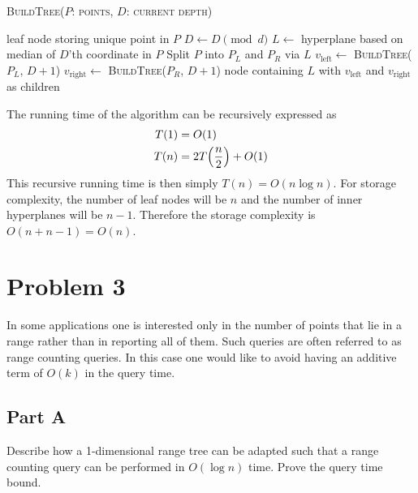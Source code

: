 \documentclass[12pt]{extarticle}
\begin{document}
\begin{solution}
    \begin{algorithm}[H]
        \caption{\textsc{BuildTree($P$: points, $D$: current depth)}}
        \begin{algorithmic}
                \State \Return leaf node storing unique point in $P$
            \Else
                \State $D \gets D \pmod{d}$
                \State $L \gets$ hyperplane based on median of $D$'th coordinate in $P$ 
                \State Split $P$ into $P_L$ and $P_R$ via $L$
                \State $v_{\text{left}} \gets $ \textsc{BuildTree}($P_L$, $D+1$)
                \State $v_{\text{right}} \gets $ \textsc{BuildTree}($P_R$, $D+1$)
                \State \Return node containing $L$ with $v_{\text{left}}$ and $v_{\text{right}}$ as children
            \EndIf
        \end{algorithmic}
    \end{algorithm}

    The running time of the algorithm can be recursively expressed as
    \begin{align*}
        T(1) &= O(1) \\
        T(n) &= 2 T\qty(\frac{n}{2}) + O(1)
    \end{align*}
    This recursive running time is then simply $T(n) = O(n \log n)$. For storage complexity, the number of leaf nodes will be $n$ and the number of inner hyperplanes will be $n - 1$. Therefore the storage complexity is $O(n + n - 1) = O(n)$.
\end{solution}

\section*{Problem 3}
In some applications one is interested only in the number of points that lie in a range rather than in reporting all of them. Such queries are often referred to as range counting queries. In this case one would like to avoid having an additive term of $O(k)$ in the query time.

\subsection*{Part A}
Describe how a 1-dimensional range tree can be adapted such that a range counting query can be performed in $O(\log n)$ time. Prove the query time bound.
\end{document}
